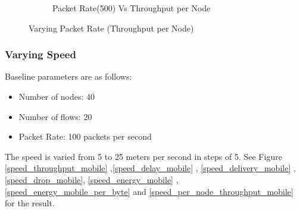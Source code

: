 \begin{figure}[h]
\begin{subfigure}{.5\textwidth}
         \caption{Packet Rate(500) Vs Throughput per Node}
        \end{subfigure}
\caption{Varying Packet Rate (Throughput per Node)}
\label{packet_rate_per_node_throughput_mobile}
\end{figure}

\subsubsection{Varying Speed}
Baseline parameters are as follows:
\begin{itemize}
    \item Number of nodes: 40
    \item Number of flows: 20
    \item Packet Rate: 100 packets per second
\end{itemize}
The speed is varied from 5 to 25 meters per second in steps of 5.
See Figure \ref{speed_throughput_mobile} ,\ref{speed_delay_mobile} , \ref{speed_delivery_mobile} , \ref{speed_drop_mobile}, \ref{speed_energy_mobile} , \ref{speed_energy_mobile_per_byte} and \ref{speed_per_node_throughput_mobile} for the result.
